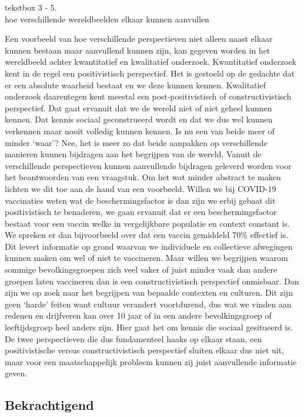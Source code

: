 \documentclass{jote-book}
\begin{document}
	\begin{bookbox}{\raggedright tekstbox 3 - 5. \\hoe verschillende wereldbeelden elkaar kunnen aanvullen}
		Een voorbeeld van hoe verschillende perspectieven niet alleen naast elkaar kunnen bestaan maar aanvullend kunnen zijn, kan gegeven worden in het wereldbeeld achter kwantitatief en kwalitatief onderzoek. Kwantitatief onderzoek kent in de regel een positivistisch perspectief. Het is gestoeld op de gedachte dat er een absolute waarheid bestaat en we deze kunnen kennen. Kwalitatief onderzoek daarentegen kent meestal een post-positivistisch of constructivistisch perspectief. Dat gaat ervanuit dat we de wereld niet of niet geheel kunnen kennen. Dat kennis sociaal geconstrueerd wordt en dat we dus wel kunnen verkennen maar nooit volledig kunnen kennen. Is nu een van beide meer of minder ‘waar'? Nee, het is meer zo dat beide aanpakken op verschillende manieren kunnen bijdragen aan het begrijpen van de wereld. Vanuit de verschillende perspectieven kunnen aanvullende bijdragen geleverd worden voor het beantwoorden van een vraagstuk. Om het wat minder abstract te maken lichten we dit toe aan de hand van een voorbeeld. Willen we bij COVID-19 vaccinaties weten wat de beschermingsfactor is dan zijn we erbij gebaat dit positivistisch te benaderen, we gaan ervanuit dat er een beschermingsfactor bestaat voor een vaccin welke in vergelijkbare populatie en context constant is. We spreken er dan bijvoorbeeld over dat een vaccin gemiddeld 70\% effectief is. Dit levert informatie op grond waarvan we individuele en collectieve afwegingen kunnen maken om wel of niet te vaccineren. Maar willen we begrijpen waarom sommige bevolkingsgroepen zich veel vaker of juist minder vaak dan andere groepen laten vaccineren dan is een constructivistisch perspectief onmisbaar. Dan zijn we op zoek naar het begrijpen van bepaalde contexten en culturen. Dit zijn geen ‘harde' feiten want cultuur verandert voortdurend, dus wat we vinden aan redenen en drijfveren kan over 10 jaar of in een andere bevolkingsgroep of leeftijdsgroep heel anders zijn. Hier gaat het om kennis die sociaal gesitueerd is. De twee perspectieven die dus fundamenteel haaks op elkaar staan, een positivistische versus constructivistisch perspectief sluiten elkaar dus niet uit, maar voor een maatschappelijk probleem kunnen zij juist aanvullende informatie geven.
	\end{bookbox}

	\subsection{Bekrachtigend}
\end{document}
